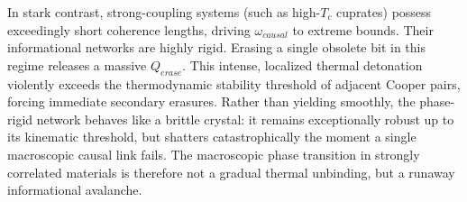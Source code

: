 \documentclass[11pt,a4paper]{article}
\begin{document}
In stark contrast, strong-coupling systems (such as high-$T_c$ cuprates) possess exceedingly short coherence lengths, driving $\omega_{causal}$ to extreme bounds. Their informational networks are highly rigid. Erasing a single obsolete bit in this regime releases a massive $Q_{erase}$. This intense, localized thermal detonation violently exceeds the thermodynamic stability threshold of adjacent Cooper pairs, forcing immediate secondary erasures. Rather than yielding smoothly, the phase-rigid network behaves like a brittle crystal: it remains exceptionally robust up to its kinematic threshold, but shatters catastrophically the moment a single macroscopic causal link fails. The macroscopic phase transition in strongly correlated materials is therefore not a gradual thermal unbinding, but a runaway informational avalanche.





\end{document}
